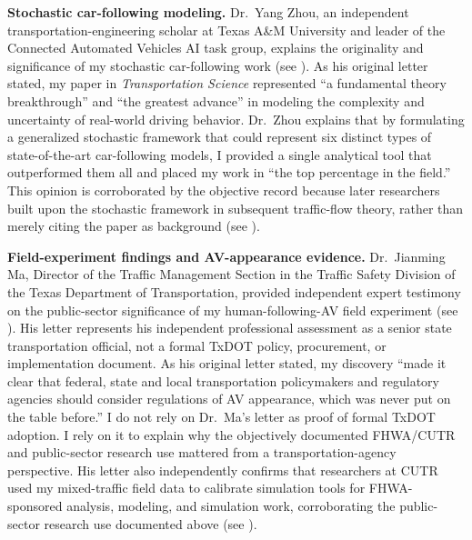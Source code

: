 \documentclass[11pt,letterpaper]{article}
\begin{document}
\textbf{Stochastic car-following modeling.} Dr.~Yang Zhou, an independent transportation-engineering scholar at Texas A\&M University and leader of the Connected Automated Vehicles AI task group, explains the originality and significance of my stochastic car-following work (see ). As his original letter stated, my paper in \textit{Transportation Science} represented ``a fundamental theory breakthrough'' and ``the greatest advance'' in modeling the complexity and uncertainty of real-world driving behavior. Dr.~Zhou explains that by formulating a generalized stochastic framework that could represent six distinct types of state-of-the-art car-following models, I provided a single analytical tool that outperformed them all and placed my work in ``the top percentage in the field.'' This opinion is corroborated by the objective record because later researchers built upon the stochastic framework in subsequent traffic-flow theory, rather than merely citing the paper as background (see ).

\textbf{Field-experiment findings and AV-appearance evidence.} Dr.~Jianming Ma, Director of the Traffic Management Section in the Traffic Safety Division of the Texas Department of Transportation, provided independent expert testimony on the public-sector significance of my human-following-AV field experiment (see ). His letter represents his independent professional assessment as a senior state transportation official, not a formal TxDOT policy, procurement, or implementation document. As his original letter stated, my discovery ``made it clear that federal, state and local transportation policymakers and regulatory agencies should consider regulations of AV appearance, which was never put on the table before.'' I do not rely on Dr.~Ma's letter as proof of formal TxDOT adoption. I rely on it to explain why the objectively documented FHWA/CUTR and public-sector research use mattered from a transportation-agency perspective. His letter also independently confirms that researchers at CUTR used my mixed-traffic field data to calibrate simulation tools for FHWA-sponsored analysis, modeling, and simulation work, corroborating the public-sector research use documented above (see ).
\end{document}
